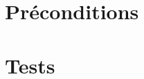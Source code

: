 \documentclass[a4paper,11pt]{article}
\begin{document}
\begin{Form}
\section{Préconditions}
\section{Tests}
\end{Form}
\end{document}
